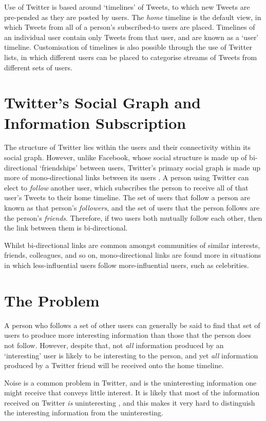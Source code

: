 Use of Twitter is based around `timelines' of Tweets, to which new Tweets are pre-pended as they are posted by users. The \textit{home} timeline is the default view, in which Tweets from all of a person's subscribed-to users are placed. Timelines of an individual user contain only Tweets from that user, and are known as a `user' timeline. Customisation of timelines is also possible through the use of Twitter lists, in which different users can be placed to categorise streams of Tweets from different sets of users.


\section{Twitter's Social Graph and Information Subscription}
The structure of Twitter lies within the users and their connectivity within its social graph. However, unlike Facebook, whose social structure is made up of bi-directional `friendships' between users, Twitter's primary social graph is made up more of mono-directional links between its users \cite{edwards13}. A person using Twitter can elect to \textit{follow} another user, which subscribes the person to receive all of that user's Tweets to their home timeline. The set of users that follow a person are known as that person's \textit{followers}, and the set of users that the person follows are the person's \textit{friends}. Therefore, if two users both mutually follow each other, then the link between them is bi-directional.

Whilst bi-directional links are common amongst communities of similar interests, friends, colleagues, and so on, mono-directional links are found more in situations in which less-influential users follow more-influential users, such as celebrities.


\section{The Problem}
A person who follows a set of other users can generally be said to find that set of users to produce more interesting information than those that the person does not follow. However, despite that, not \textit{all} information produced by an `interesting' user is likely to be interesting to the person, and yet \textit{all} information produced by a Twitter friend will be received onto the home timeline.

Noise is a common problem in Twitter, and is the uninteresting information one might receive that conveys little interest. It is likely that most of the information received on Twitter \textit{is} uninteresting \cite{alonso10}, and this makes it very hard to distinguish the interesting information from the uninteresting.


